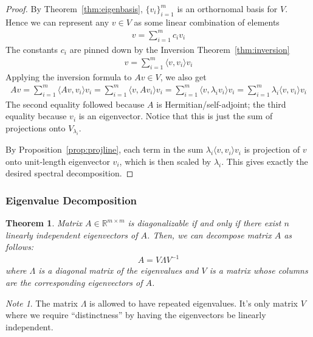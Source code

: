 \documentclass[12pt]{book}
\numberwithin{equation}{section} %
\theoremstyle{plain}
\newtheorem{thm}{Theorem}[section]
\theoremstyle{definition}
\theoremstyle{remark}
\newtheorem*{note}{Note}
\newcommand{\Rmm}{\mathbb{R}^{m\times m}}
\begin{document}
\begin{proof}
By Theorem~\ref{thm:eigenbasis}, $\{v_i\}_{i=1}^m$ is an orthornomal
basis for $V$.
Hence we can represent any $v\in V$ as some linear combination of
elements
\begin{align*}
  v = \sum_{i=1}^m c_i v_i
\end{align*}
The constants $c_i$ are pinned down by the Inversion
Theorem~\ref{thm:inversion}
\begin{align*}
  v = \sum_{i=1}^m \langle v,v_i\rangle v_i
\end{align*}
Applying the inversion formula to $Av\in V$, we also get
\begin{align*}
  Av
  = \sum_{i=1}^m \langle Av,v_i\rangle v_i
  = \sum_{i=1}^m \langle v,Av_i\rangle v_i
  = \sum_{i=1}^m \langle v,\lambda_i v_i\rangle v_i
  = \sum_{i=1}^m \lambda_i \langle v,v_i\rangle v_i
\end{align*}
The second equality followed because $A$ is Hermitian/self-adjoint;
the third equality because $v_i$ is an eigenvector.
Notice that this is just the sum of projections onto $V_{\lambda_i}$.

By Proposition~\ref{prop:projline}, each term in the sum
$\lambda_i \langle v,v_i\rangle v_i$ is projection of
$v$ onto unit-length eigenvector $v_i$, which is then scaled by
$\lambda_i$.
This gives exactly the desired spectral decomposition.
\end{proof}


\clearpage
\subsubsection{Eigenvalue Decomposition}
\label{subsec:eigenvaluedecomp}

\begin{thm}
\label{thm:eigendecomp}
Matrix $A\in \Rmm$ is diagonalizable if and only if there exist $n$
linearly independent eigenvectors of $A$. Then, we can decompose matrix
$A$ as follows:
\begin{align*}
  A =
  V \Lambda V^{-1}
\end{align*}
where $\Lambda$ is a diagonal matrix of the eigenvalues and $V$ is a matrix
whose columns are the corresponding eigenvectors of $A$.
\end{thm}
\begin{note}
The matrix $\Lambda$ is allowed to have repeated eigenvalues. It's only matrix
$V$ where we require ``distinctness'' by having the eigenvectors be
linearly independent.
\end{note}
\end{document}
